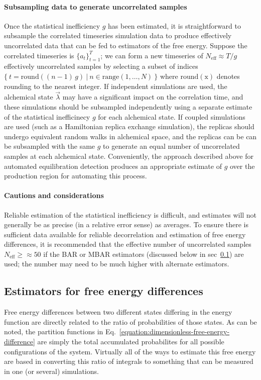 \documentclass[9pt,bestpractices]{livecoms}
\begin{document}
\paragraph{Subsampling data to generate uncorrelated samples}
Once the statistical inefficiency $g$ has been estimated, it is straightforward to subsample the correlated timeseries simulation data to produce effectively uncorrelated data that can be fed to estimators of the free energy.
Suppose the correlated timeseries is $\{a_t\}_{t=1}^T$; we can form a new timeseries of $N_{\mathrm{eff}} \approx T / g$ effectively uncorrelated samples by selecting a subset of indices $\{ \: t = \mathrm{round}((n-1) \, g) \: | \: n \in \mathrm{range}(1,\ldots ,N) \: \}$ where $\mathrm{round(x)}$ denotes rounding to the nearest integer.
%
If independent simulations are used, the alchemical state $\vec{\lambda}$ may have a significant impact on the correlation time, and these simulations should be subsampled independently using a separate estimate of the statistical inefficinecy $g$ for each alchemical state.
If coupled simulations are used (such as a Hamiltonian replica exchange simulation), the replicas should undergo equivalent random walks in alchemical space, and the replicas can be can be subsampled with the same $g$ to generate an equal number of uncorrelated samples at each alchemical state.
Conveniently, the approach described above for automated equilibration detection produces an appropriate estimate of $g$ over the production region for automating this process.
%
\paragraph{Cautions and considerations}
Reliable estimation of the statistical inefficiency is difficult, and estimates will not generally be as precise (in a relative error sense) as averages.
To ensure there is sufficient data available for reliable decorrelation and estimation of free energy differences, it is recommended that the effective number of uncorrelated samples $N_{\mathrm{eff}} \ge \approx 50$ if the BAR or MBAR estimators (discussed below in sec~\ref{subsec:estimators}) are used; the number may need to be much higher with alternate estimators.
%
\subsection{Estimators for free energy differences}
\label{subsec:estimators}
Free energy differences between two different states differing in the energy function are directly related to the
ratio of probabilities of those states.
As can be noted, the partition functions in Eq.~\ref{equation:dimensionless-free-energy-difference} are simply the total accumulated probabilites for all possible configurations of the system. Virtually all of the ways to estimate this free energy are based in converting this ratio of integrals to something that can be measured in one (or several) simulations.  
%
\end{document}
